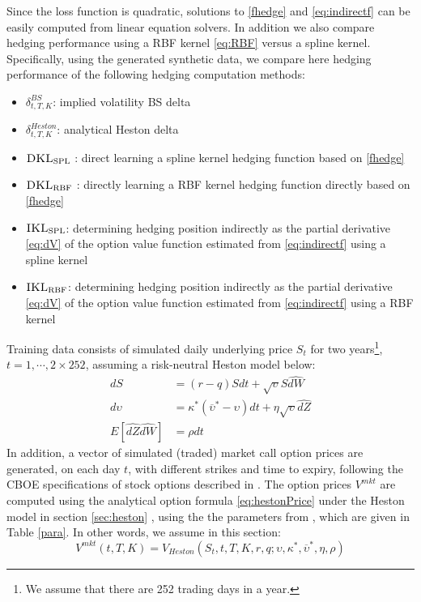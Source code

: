 \documentclass[letterpaper,12pt,titlepage,oneside,final]{book}
\numberwithin{equation}{section}
\theoremstyle{definition}
\newcommand{\Vmkt}{V^{mkt}}
\newcommand{\DKLs}{\bf\textsc{DKL}_{\text{SPL}}}
\newcommand{\DKLg}{\bf\textsc{DKL}_{\text{RBF}}}
\newcommand{\IKLs}{\bf\textsc{IKL}_{\text{SPL}}}
\newcommand{\IKLg}{\bf\textsc{IKL}_{\text{RBF}}}
\begin{document}
Since the loss function is  quadratic, solutions to \eqref{fhedge} and \eqref{eq:indirectf}
can be easily computed from linear equation solvers.
In addition we also compare hedging performance using a RBF kernel \eqref{eq:RBF} versus a spline kernel.
Specifically, using the generated synthetic data, we compare here hedging performance  of the following hedging computation methods:
 \begin{itemize}
 \item  $\delta^{BS}_{t,T,K}$:  implied  volatility BS delta
 \item $\delta^{Heston}_{t,T,K}$:   analytical Heston delta
 \item $\DKLs$ : direct learning a spline kernel hedging  function based on \eqref{fhedge}
 \item $\DKLg$ : directly learning a RBF kernel hedging  function directly based on \eqref{fhedge}
 \item ${\IKLs}$: determining hedging position indirectly  as the partial derivative \eqref{eq:dV} of the  option value function   estimated from \eqref{eq:indirectf} using a spline kernel

\item ${\IKLg}$: determining hedging position indirectly  as the partial derivative \eqref{eq:dV} of the  option value function   estimated from \eqref{eq:indirectf} using a RBF kernel

\end{itemize}

Training data consists of simulated daily underlying price $S_t$ for two years\footnote{We assume that there are 252 trading days in a year.}, $t=1,\cdots, 2\times 252$, assuming a  risk-neutral Heston model below:
\[
	\begin{split}
	dS&=(r-q) S dt + \sqrt{\upsilon} S \hat{dW}\\
	d\upsilon&=\kappa^*(\overline{\upsilon}^*-\upsilon)dt+\eta \sqrt{\upsilon}\hat{dZ}\\
	E[\hat{dZ}\hat{dW}]&=\rho dt
	\end{split}
\]
In addition,  a vector of simulated (traded)  market call option prices  are  generated,  on each day $t$, with different strikes and time to expiry, following  the CBOE specifications of stock options described in  \cite{hull2006options}.
 The option prices $\Vmkt$ are  computed using  the analytical option 
 formula \eqref{eq:hestonPrice} under the Heston model \citep{heston1993closed} in section \ref{sec:heston} ,
 using the the parameters  from \citep{bakshi1997empirical}, which are given in Table \ref{para}. In other words, we assume in this section:
 \[
\Vmkt(t,T,K)=V_{Heston}(S_t,t,T,K,r,q;\upsilon,\kappa^*,\overline{\upsilon}^*,\eta,\rho)
 \]
\end{document}
